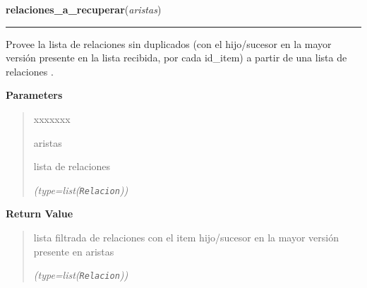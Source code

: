 \hspace{.8\funcindent}\begin{boxedminipage}{\funcwidth}

    \raggedright \textbf{relaciones\_a\_recuperar}(\textit{aristas})

    \vspace{-1.5ex}

    \rule{\textwidth}{0.5\fboxrule}
\setlength{\parskip}{2ex}
    Provee la lista de relaciones sin duplicados (con el hijo/sucesor en la
    mayor versión presente en la lista recibida, por cada id\_item) a 
    partir de una lista de relaciones .

\setlength{\parskip}{1ex}
      \textbf{Parameters}
      \vspace{-1ex}

      \begin{quote}
        \begin{Ventry}{xxxxxxx}

          \item[aristas]

          lista de relaciones

            {\it (type=list(\texttt{Relacion}))}

        \end{Ventry}

      \end{quote}

      \textbf{Return Value}
    \vspace{-1ex}

      \begin{quote}
      lista filtrada de relaciones con el item hijo/sucesor en la mayor 
      versión presente en aristas

      {\it (type=list(\texttt{Relacion}))}

      \end{quote}

    \end{boxedminipage}

    \label{saip:lib:func:relaciones_b_recuperar}

    \vspace{0.5ex}

